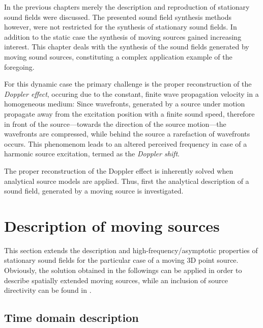 In the previous chapters merely the description and reproduction of stationary sound fields were discussed.
The presented sound field synthesis methods however, were not restricted for the synthesis of stationary sound fields.
In addition to the static case the synthesis of moving sources gained increasing interest.
This chapter deals with the synthesis of the sound fields generated by moving sound sources, constituting a complex application example of the foregoing.

For this dynamic case the primary challenge is the proper reconstruction of the \emph{Doppler effect}, occuring due to the constant, finite wave propagation velocity in a homogeneous medium:
Since wavefronts, generated by a source under motion propagate away from the excitation position with a finite sound speed, therefore in front of the source---towards the direction of the source motion---the wavefronts are compressed, while behind the source a rarefaction of wavefronts occurs.
This phenomenom leads to an altered perceived frequency in case of a harmonic source excitation, termed as the \emph{Doppler shift}.

The proper reconstruction of the Doppler effect is inherently solved when analytical source models are applied.
Thus, first the analytical description of a sound field, generated by a moving source is investigated.

\section{Description of moving sources}

This section extends the description and high-frequency/asymptotic properties of stationary sound fields for the particular case of a moving 3D point source.
Obviously, the solution obtained in the followings can be applied in order to describe spatially extended moving sources, while an inclusion of source directivity can be found in \cite{Warren1976, Ahrens2011_moving_source_WFS}.

\subsection{Time domain description}
	
